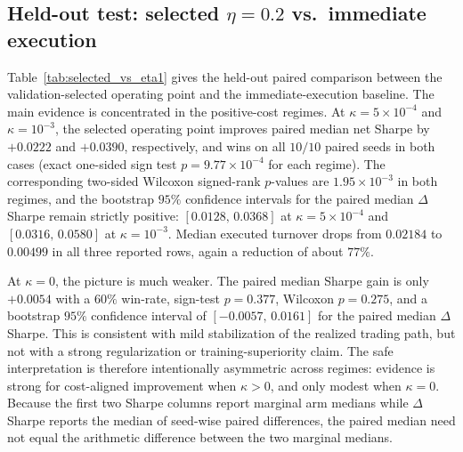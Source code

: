 \documentclass[10pt,twocolumn]{article}
\newcommand{\kappaTC}{\kappa}
\begin{document}
\subsection{Held-out test: selected $\eta=0.2$ vs.\ immediate execution}
Table~\ref{tab:selected_vs_eta1} gives the held-out paired comparison between the validation-selected operating point and the immediate-execution baseline. The main evidence is concentrated in the positive-cost regimes. At $\kappa=5\times10^{-4}$ and $\kappa=10^{-3}$, the selected operating point improves paired median net Sharpe by $+0.0222$ and $+0.0390$, respectively, and wins on all $10/10$ paired seeds in both cases (exact one-sided sign test $p=9.77\times10^{-4}$ for each regime). The corresponding two-sided Wilcoxon signed-rank $p$-values are $1.95\times10^{-3}$ in both regimes, and the bootstrap $95\%$ confidence intervals for the paired median $\Delta$Sharpe remain strictly positive: $[0.0128,\,0.0368]$ at $\kappa=5\times10^{-4}$ and $[0.0316,\,0.0580]$ at $\kappa=10^{-3}$. Median executed turnover drops from $0.02184$ to $0.00499$ in all three reported rows, again a reduction of about $77\%$.

At $\kappa=0$, the picture is much weaker. The paired median Sharpe gain is only $+0.0054$ with a $60\%$ win-rate, sign-test $p=0.377$, Wilcoxon $p=0.275$, and a bootstrap $95\%$ confidence interval of $[-0.0057,\,0.0161]$ for the paired median $\Delta$Sharpe. This is consistent with mild stabilization of the realized trading path, but not with a strong regularization or training-superiority claim. The safe interpretation is therefore intentionally asymmetric across regimes: evidence is strong for cost-aligned improvement when $\kappaTC>0$, and only modest when $\kappaTC=0$. Because the first two Sharpe columns report marginal arm medians while $\Delta$Sharpe reports the median of seed-wise paired differences, the paired median need not equal the arithmetic difference between the two marginal medians.
\end{document}
